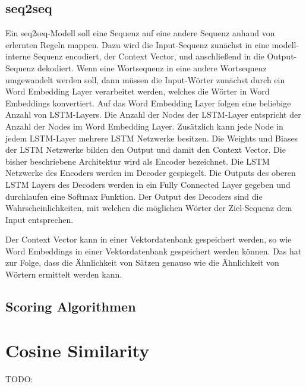 \subsection{seq2seq}
Ein seq2seq-Modell soll eine Sequenz auf eine andere Sequenz anhand von erlernten Regeln mappen.
Dazu wird die Input-Sequenz zunächst in eine modell-interne Sequenz encodiert, der Context Vector, und anschließend in die Output-Sequenz dekodiert.
Wenn eine Wortsequenz in eine andere Wortsequenz umgewandelt werden soll, dann müssen die Input-Wörter zunächst durch ein Word Embedding Layer verarbeitet werden, welches die Wörter in Word Embeddings konvertiert.
Auf das Word Embedding Layer folgen eine beliebige Anzahl von LSTM-Layers.
Die Anzahl der Nodes der LSTM-Layer entspricht der Anzahl der Nodes im Word Embedding Layer.
Zusätzlich kann jede Node in jedem LSTM-Layer mehrere LSTM Netzwerke besitzen.
Die Weights und Biases der LSTM Netzwerke bilden den Output und damit den Context Vector.
Die bisher beschriebene Architektur wird als Encoder bezeichnet.
Die LSTM Netzwerke des Encoders werden im Decoder gespiegelt.
Die Outputs des oberen LSTM Layers des Decoders werden in ein Fully Connected Layer gegeben und durchlaufen eine Softmax Funktion.
Der Output des Decoders sind die Wahrscheinlichkeiten, mit welchen die möglichen Wörter der Ziel-Sequenz dem Input entsprechen. 

Der Context Vector kann in einer Vektordatenbank gespeichert werden, so wie Word Embeddings in einer Vektordatenbank gespeichert werden können.
Das hat zur Folge, dass die Ähnlichkeit von Sätzen genauso wie die Ähnlichkeit von Wörtern ermittelt werden kann.

\subsection{Scoring Algorithmen}

\section{Cosine Similarity}
TODO: 

